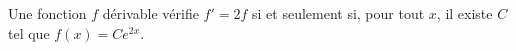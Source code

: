 Une fonction $f$ dérivable vérifie $f'=2f$ si et seulement si, pour tout $x$, il existe $C$ tel que $f(x)=Ce^{2x}$.

\begin{reponses}
\end{reponses}

